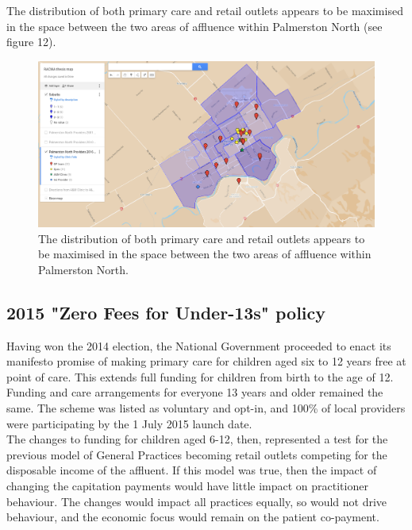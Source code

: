 \documentclass[11pt,a4paper]{article}
\begin{document}
The distribution of both primary care and retail outlets appears to be maximised in the space between the two areas of affluence within Palmerston North (see figure 12).\\


\begin{figure}[htp]
\centering
\includegraphics[scale=0.30]{fig12.png}
\caption{The distribution of both primary care and retail outlets appears to be maximised in the space between the two areas of affluence within Palmerston North.}
\label{Distribution of General Practitioners overlaid on suburb's social deprivation}
\end{figure}


\pagebreak
\subsection{2015 "Zero Fees for Under-13s" policy}
Having won the 2014 election, the National Government proceeded to enact its manifesto promise of making primary care for children aged six to 12 years free at point of care. This extends full funding for children from birth to the age of 12. Funding and care arrangements for everyone 13 years and older remained the same. The scheme was listed as voluntary and opt-in, and  100\% of local providers were participating by the 1 July 2015 launch date.\\


The changes to funding for children aged 6-12, then, represented a test for the previous model of General Practices becoming retail outlets competing for the disposable income of the affluent. If this model was true, then the impact of changing the capitation payments would have little impact on practitioner behaviour. The changes would impact all practices equally, so would not drive behaviour, and the economic focus would remain on the patient co-payment.\\
\end{document}

